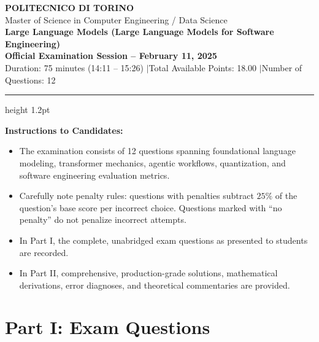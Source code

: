 \documentclass[11pt,a4paper]{article}
\begin{document}
\begin{center}
    {\Large\textbf{\color{primary}POLITECNICO DI TORINO}}\\[3pt]
    {\large Master of Science in Computer Engineering / Data Science}\\[4pt]
    {\Large\textbf{\color{secondary}Large Language Models (Large Language Models for Software Engineering)}}\\[6pt]
    \textbf{Official Examination Session -- February 11, 2025}\\[2pt]
    \small Duration: 75 minutes (14:11 -- 15:26) \quad$\vert$\quad Total Available Points: 18.00 \quad$\vert$\quad Number of Questions: 12
\end{center}
\vspace{-4pt}
\hrule height 1.2pt
\vspace{12pt}

\noindent
\begin{tcolorbox}[colback=white,colframe=primary!70,arc=1.5mm,boxrule=0.7pt,left=8pt,right=8pt,top=6pt,bottom=6pt]
\footnotesize
\textbf{Instructions to Candidates:}
\begin{itemize}[leftmargin=1.5em]
    \item The examination consists of 12 questions spanning foundational language modeling, transformer mechanics, agentic workflows, quantization, and software engineering evaluation metrics.
    \item Carefully note penalty rules: questions with penalties subtract $25\%$ of the question's base score per incorrect choice. Questions marked with ``no penalty'' do not penalize incorrect attempts.
    \item In Part I, the complete, unabridged exam questions as presented to students are recorded.
    \item In Part II, comprehensive, production-grade solutions, mathematical derivations, error diagnoses, and theoretical commentaries are provided.
\end{itemize}
\end{tcolorbox}

\vspace{10pt}

\section{Part I: Exam Questions}
\end{document}
